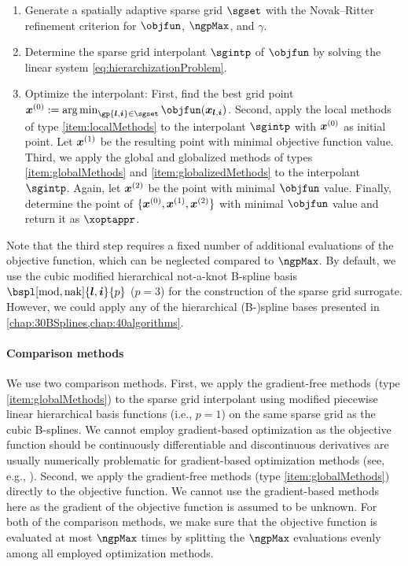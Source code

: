 \begin{enumerate}
  \item
  Generate a spatially adaptive sparse grid $\sgset$
  with the Novak--Ritter refinement criterion
  for $\objfun$, $\ngpMax$, and $\gamma$.
  
  \item
  Determine the sparse grid interpolant $\sgintp$ of $\objfun$
  by solving the linear system \eqref{eq:hierarchizationProblem}.
  
  \item
  Optimize the interpolant:
  First, find the best grid point
  $\*x^{(0)} := \argmin_{\gp{\*l,\*i} \in \sgset} \objfun(\*x_{\*l,\*i})$.
  Second, apply the local methods of type \ref{item:localMethods}
  to the interpolant $\sgintp$ with ${\boldsymbol{x}}^{(0)}$ as initial point.
  Let ${\boldsymbol{x}}^{(1)}$ be the resulting point with minimal objective function value.
  Third, we apply the global and globalized methods
  of types \ref{item:globalMethods} and \ref{item:globalizedMethods}
  to the interpolant $\sgintp$.
  Again, let ${\boldsymbol{x}}^{(2)}$ be the point with
  minimal $\objfun$ value.
  Finally, determine the point of $\{{\boldsymbol{x}}^{(0)}, {\boldsymbol{x}}^{(1)}, {\boldsymbol{x}}^{(2)}\}$
  with minimal $\objfun$ value and return it as $\xoptappr$.
\end{enumerate}

Note that the third step requires a fixed number of additional
evaluations of the objective function,
which can be neglected compared to $\ngpMax$.
By default, we use the cubic modified hierarchical not-a-knot B-spline basis
$\bspl[\modified,\nak]{\*l,\*i}{p}$ ($p = 3$)
for the construction of the sparse grid surrogate.
However, we could apply any of the hierarchical (B-)spline bases presented in
\cref{chap:30BSplines,chap:40algorithms}.

\paragraph{Comparison methods}

We use two comparison methods.
First, we apply the gradient-free methods
(type \ref{item:globalMethods}) to the sparse grid interpolant
using modified piecewise linear hierarchical basis functions
(i.e., $p = 1$) on the same sparse grid as the cubic B-splines.
We cannot employ gradient-based optimization as the objective function
should be continuously differentiable and
discontinuous derivatives are usually numerically problematic
for gradient-based optimization methods
(see, e.g., \cite{Huebner14Mehrdimensionale}).
Second, we apply the gradient-free methods
(type \ref{item:globalMethods}) directly to the objective function.
We cannot use the gradient-based methods here as the gradient of the
objective function is assumed to be unknown.
For both of the comparison methods,
we make sure that the objective function is evaluated at most $\ngpMax$ times
by splitting the $\ngpMax$ evaluations
evenly among all employed optimization methods.

